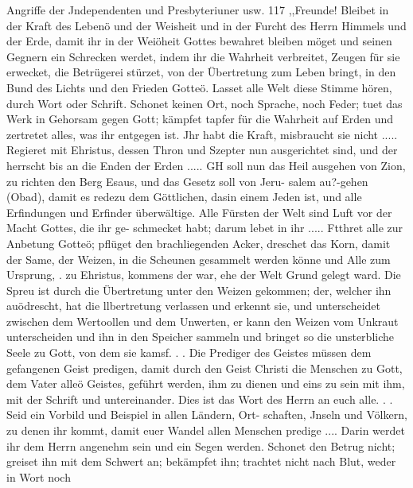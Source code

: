 Angriffe der Jndependenten und Presbyteriuner usw. 117
,,Freunde!
Bleibet in der Kraft des Lebenö und der Weisheit und in
der Furcht des Herrn Himmels und der Erde, damit ihr in der
Weiöheit Gottes bewahret bleiben möget und seinen Gegnern ein
Schrecken werdet, indem ihr die Wahrheit verbreitet, Zeugen für
sie erwecket, die Betrügerei stürzet, von der Übertretung zum
Leben bringt, in den Bund des Lichts und den Frieden Gotteö.
Lasset alle Welt diese Stimme hören, durch Wort oder Schrift.
Schonet keinen Ort, noch Sprache, noch Feder; tuet das Werk
in Gehorsam gegen Gott; kämpfet tapfer für die Wahrheit auf
Erden und zertretet alles, was ihr entgegen ist. Jhr habt die
Kraft, misbraucht sie nicht ..... Regieret mit Ehristus, dessen
Thron und Szepter nun ausgerichtet sind, und der herrscht bis an
die Enden der Erden ..... GH soll nun das Heil ausgehen
von Zion, zu richten den Berg Esaus, und das Gesetz soll von Jeru-
salem au?-gehen (Obad), damit es redezu dem Göttlichen, dasin einem
Jeden ist, und alle Erfindungen und Erfinder überwältige. Alle
Fürsten der Welt sind Luft vor der Macht Gottes, die ihr ge-
schmecket habt; darum lebet in ihr .....
Ftthret alle zur Anbetung Gotteö; pflüget den brachliegenden
Acker, dreschet das Korn, damit der Same, der Weizen, in die
Scheunen gesammelt werden könne und Alle zum Ursprung,
. zu Ehristus, kommens der war, ehe der Welt Grund gelegt ward.
Die Spreu ist durch die Übertretung unter den Weizen gekommen;
der, welcher ihn auödrescht, hat die llbertretung verlassen und
erkennt sie, und unterscheidet zwischen dem Wertoollen und dem
Unwerten, er kann den Weizen vom Unkraut unterscheiden und
ihn in den Speicher sammeln und bringet so die unsterbliche
Seele zu Gott, von dem sie kamsf. . . Die Prediger des Geistes
müssen dem gefangenen Geist predigen, damit durch den Geist
Christi die Menschen zu Gott, dem Vater alleö Geistes, geführt
werden, ihm zu dienen und eins zu sein mit ihm, mit der Schrift
und untereinander. Dies ist das Wort des Herrn an euch alle.
. .   Seid ein Vorbild und Beispiel in allen Ländern, Ort-
schaften, Jnseln und Völkern, zu denen ihr kommt, damit euer
Wandel allen Menschen predige .... Darin werdet ihr dem
Herrn angenehm sein und ein Segen werden.
Schonet den Betrug nicht; greiset ihn mit dem Schwert an;
bekämpfet ihn; trachtet nicht nach Blut, weder in Wort noch


